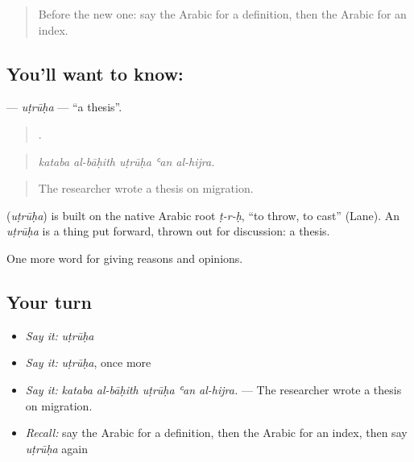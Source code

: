 \label{lesson:AR-C396-utruha}



\begin{quote}
Before the new one: say the Arabic for a definition, then the Arabic for an index.
\end{quote}

\subsection*{You'll want to know: }
\textbf{} — \emph{uṭrūḥa} — \textquotedblleft{}a thesis\textquotedblright{}.

\begin{quote}
    .
\end{quote}

\begin{quote}
\emph{kataba al-bāḥith uṭrūḥa ʿan al-hijra.}
\end{quote}

\begin{quote}
The researcher wrote a thesis on migration.
\end{quote}

\begin{cousinweb}
\textbf{} (\emph{uṭrūḥa}) is built on the native Arabic root \emph{ṭ-r-ḥ}, \textquotedblleft{}to throw, to cast\textquotedblright{} (Lane). An \emph{uṭrūḥa} is a thing put forward, thrown out for discussion: a thesis.
\end{cousinweb}

\begin{grammarlens}[title={What you've built}]
One more word for giving reasons and opinions.
\end{grammarlens}

\subsection*{Your turn}
\begin{itemize}
\raggedright
  \item \emph{Say it:} \emph{uṭrūḥa}
  \item \emph{Say it:} \emph{uṭrūḥa}, once more
  \item \emph{Say it:} \emph{kataba al-bāḥith uṭrūḥa ʿan al-hijra.} — The researcher wrote a thesis on migration.
  \item \emph{Recall:} say the Arabic for a definition, then the Arabic for an index, then say \emph{uṭrūḥa} again
\end{itemize}

